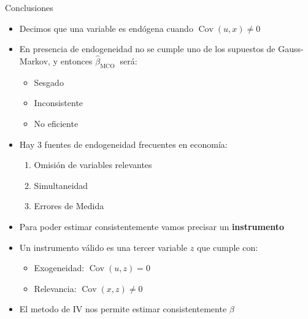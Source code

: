 \documentclass[10pt]{beamer}
\begin{document}
\begin{frame}{Conclusiones}
    \begin{itemize}
        \item Decimos que una variable es endógena cuando $\operatorname{Cov}(u, x) \neq 0$
        \item En presencia de endogeneidad no se cumple uno de los supuestos de Gauss-Markov, y entonces $\hat{\beta}_{\text {MCO }}$ será:
        \begin{itemize}
            \item Sesgado
            \item Inconsistente
            \item No eficiente
        \end{itemize}
        \item Hay 3 fuentes de endogeneidad frecuentes en economía:
        \begin{enumerate}
            \item Omisión de variables relevantes
            \item Simultaneidad
            \item Errores de Medida
        \end{enumerate}
        \item Para poder estimar consistentemente vamos precisar un \textbf{instrumento}
        \item Un instrumento válido es una tercer variable $z$ que cumple con:
        \begin{itemize}
            \item Exogeneidad: $\operatorname{Cov}(u, z)=0$
            \item Relevancia: $\operatorname{Cov}(x, z) \neq 0$
        \end{itemize}
        \item El metodo de IV nos permite estimar consistentemente $\beta$
    \end{itemize}
\end{frame}
\end{document}
